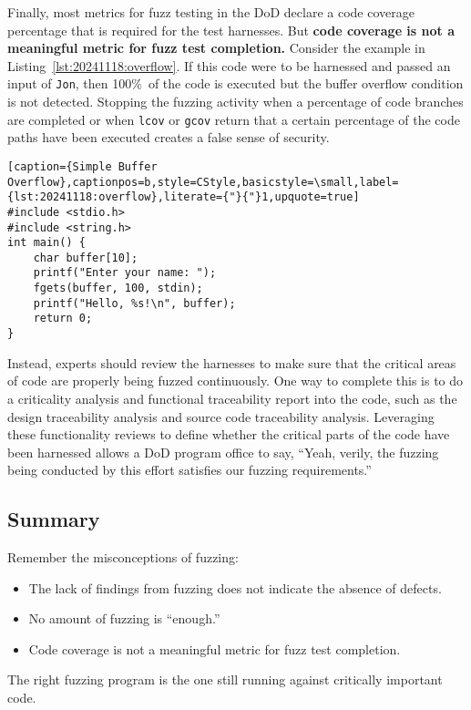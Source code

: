 Finally, most metrics for fuzz testing in the DoD declare a code coverage percentage that is required for the test harnesses. But \textbf{code coverage is not a meaningful metric for fuzz test completion.} Consider the example in Listing~\ref{lst:20241118:overflow}. If this code were to be harnessed and passed an input of \texttt{Jon}, then 100\%\ of the code is executed but the buffer overflow condition is not detected. Stopping the fuzzing activity when a percentage of code branches are completed or when \texttt{lcov} or \texttt{gcov} return that a certain percentage of the code paths have been executed creates a false sense of security.

\begin{lstlisting}[caption={Simple Buffer Overflow},captionpos=b,style=CStyle,basicstyle=\small,label={lst:20241118:overflow},literate={"}{"}1,upquote=true]
#include <stdio.h>
#include <string.h>
int main() {
    char buffer[10];
    printf("Enter your name: ");
    fgets(buffer, 100, stdin);
    printf("Hello, %s!\n", buffer);
    return 0;
}
\end{lstlisting}

Instead, experts should review the harnesses to make sure that the critical areas of code are properly being fuzzed continuously. One way to complete this is to do a criticality analysis and functional traceability report into the code, such as the design traceability analysis\autocite[\pno~114]{20241118:ieee1012} and source code traceability analysis\autocite[\pno~119]{20241118:ieee1012}. Leveraging these functionality reviews to define whether the critical parts of the code have been harnessed allows a DoD program office to say, ``Yeah, verily, the fuzzing being conducted by this effort satisfies our fuzzing requirements.''

\subsection*{Summary}
Remember the misconceptions of fuzzing:
\begin{itemize}
    \item The lack of findings from fuzzing does not indicate the absence of defects.
    \item No amount of fuzzing is ``enough.''
    \item Code coverage is not a meaningful metric for fuzz test completion.
\end{itemize}

The right fuzzing program is the one still running against critically important code.
